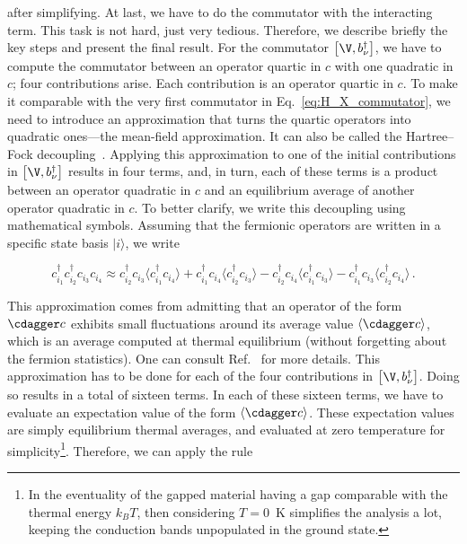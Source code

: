 \noindent after simplifying.
At last, we have to do the commutator with the interacting term.
This task is not hard, just very tedious.
Therefore, we describe briefly the key steps and present the final result.
For the commutator $\left[\V, b_\nu^{\dagger}\right]$, we have to compute the commutator between an operator quartic in $c$ with one quadratic in $c$; four contributions arise.
Each contribution is an operator quartic in $c$.
To make it comparable with the very first commutator in Eq.~\ref{eq:H_X_commutator}, we need to introduce an approximation that turns the quartic operators into quadratic ones---the mean-field approximation.
It can also be called the Hartree--Fock decoupling~\cite{Bruus_Flensberg_2004}.
Applying this approximation to one of the initial contributions in $\left[\V, b_\nu^{\dagger}\right]$ results in four terms, and, in turn, each of these terms is a product between an operator quadratic in $c$ and an equilibrium average of another operator quadratic in $c$.
To better clarify, we write this decoupling using mathematical symbols.
Assuming that the fermionic operators are written in a specific state basis $| i \rangle$, we write

\begin{equation}
    c^{\dagger}_{i_1} c^{\dagger}_{i_2} c_{i_3} c_{i_4} \approx c^{\dagger}_{i_2} c_{i_3} \langle c^{\dagger}_{i_1} c_{i_4} \rangle  + c^{\dagger}_{i_1} c_{i_4} \langle c^{\dagger}_{i_2} c_{i_3} \rangle - c^{\dagger}_{i_2} c_{i_4} \langle c^{\dagger}_{i_1} c_{i_3} \rangle - c^{\dagger}_{i_1} c_{i_3} \langle c^{\dagger}_{i_2} c_{i_4} \rangle\,.
\end{equation}

\noindent This approximation comes from admitting that an operator of the form $\cdagger c$ exhibits small fluctuations around its average value $\langle \cdagger c \rangle$, which is an average computed at thermal equilibrium (without forgetting about the fermion statistics).
One can consult Ref.~\cite{Bruus_Flensberg_2004} for more details.
This approximation has to be done for each of the four contributions in $\left[\V, b_\nu^{\dagger}\right]$.
Doing so results in a total of sixteen terms.
In each of these sixteen terms, we have to evaluate an expectation value of the form $\langle \cdagger c \rangle$.
These expectation values are simply equilibrium thermal averages, and evaluated at zero temperature for simplicity\footnote{In the eventuality of the gapped material having a gap comparable with the thermal energy $k_B T$, then considering $T = 0 $~\unit{\kelvin} simplifies the analysis a lot, keeping the conduction bands unpopulated in the ground state.}.
Therefore, we can apply the rule

